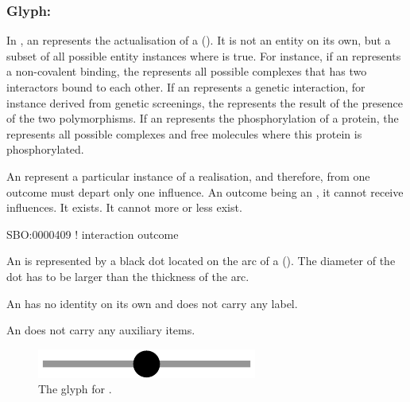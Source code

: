 
\subsubsection{Glyph: }\label{sec:outcome}

In \ERs, an  represents the actualisation of a  (). It is not an entity on its own, but a subset of all possible entity instances where   is true. For instance, if an  represents a non-covalent binding, the  represents all possible complexes that has two interactors bound to each other. If an  represents a genetic interaction, for instance derived from genetic screenings, the  represents the result of the presence of the two polymorphisms. If an  represents the phosphorylation of a protein, the  represents all possible complexes and free molecules where this protein is phosphorylated.

An  represent a particular instance of a realisation, and therefore, from one outcome must depart only one influence. An outcome being an , it cannot receive influences. It exists. It cannot more or less exist. 

\begin{glyphDescription}

\glyphSboTerm SBO:0000409 ! interaction outcome

\glyphContainer  An  is represented by a black dot located on the arc of a  (). The diameter of the dot has to be larger than the thickness of the arc.

\glyphLabel An  has no identity on its own and does not carry any label. 

\glyphAux An  does not carry any auxiliary items.

\end{glyphDescription}

\begin{figure}[H]
  \centering
  \includegraphics[scale = 0.5]{images/outcome}
  \caption{The \ER glyph for .}
  \label{fig:outcome}
\end{figure}

